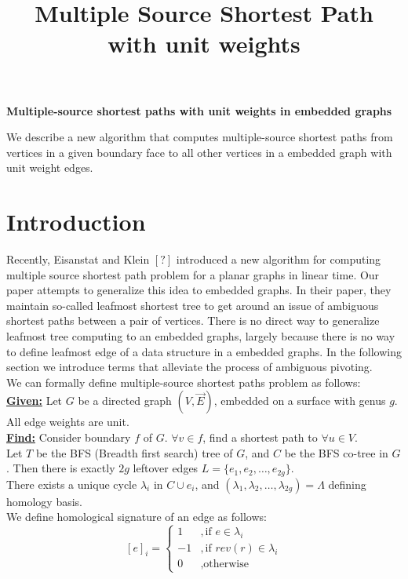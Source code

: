 \documentclass{article}
\begin{document}
\title{Multiple Source Shortest Path with unit weights}

\begin{center}
\textbf{\large Multiple-source shortest paths with unit weights in embedded
graphs}
\end{center}

\DRAFT

\begin{bigabstract}
We describe a new algorithm that computes multiple-source shortest paths from
vertices in a given boundary face to all other vertices in a embedded graph
with unit weight edges.
\end{bigabstract}

\section{Introduction}

Recently, Eisanstat and Klein $[?]$ introduced a new algorithm for computing
multiple source shortest path problem for a planar graphs in linear time. Our 
paper attempts to generalize this idea to embedded graphs. In their paper,
they maintain so-called leafmost shortest tree to get around an issue of 
ambiguous shortest paths between a pair of vertices. There is no direct way 
to generalize leafmost tree computing to an embedded graphs, largely because
there is no way to define leafmost edge of a data structure in a embedded graphs.
In the following section we introduce terms that alleviate the process of 
ambiguous pivoting.\\

We can formally define multiple-source shortest paths problem as follows: \\

\textbf{\underline{Given:}} Let $G$ be a directed graph $(V, \vec{E})$, embedded
on a surface with genus $g$. All edge weights are unit. \\

\textbf{\underline{Find:}} Consider boundary $f$ of $G$. $\forall v \in f$, find
a shortest path to $\forall u \in V$. \\

Let $T$ be the BFS (Breadth first search) tree of $G$, and $C$ be the BFS co-tree
in $G$. Then there is exactly $2g$ leftover edges $L = \{e_1, e_2, \ldots, e_{2g}\}$. \\

There exists a unique cycle $\lambda_i$ in $C \cup {e_i}$, and $(\lambda_1, 
\lambda_2, \ldots, \lambda_{2g}) = \Lambda$ defining homology basis. \\
We define homological signature of an edge as follows:
\[ [e]_{i} = \begin{cases} 1 & ,\mbox{if } e \in \lambda_i \\
                          -1 & ,\mbox{if } rev(r) \in \lambda_i \\
                           0 & ,\mbox{otherwise} \end{cases}\]
\end{document}
